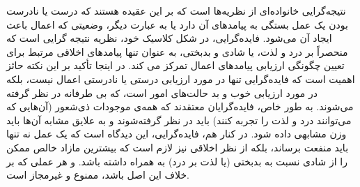 نتیجه‌گرایی خانواده‌ای از نظریه‌ها است که بر این عقیده هستند که درست یا نادرست بودن یک عمل بستگی به پیامدهای آن دارد یا به عبارت دیگر، وضعیتی که اعمال باعث ایجاد آن می‌شود.
فایده‌گرایی، در شکل کلاسیک خود، نظریه نتیجه گرایی است که منحصراً بر درد و لذت، یا شادی و بدبختی، به عنوان تنها پیامدهای اخلاقی مرتبط برای تعیین چگونگی ارزیابی پیامدهای اعمال تمرکز می کند.
در اینجا تأکید بر این نکته حائز اهمیت است که فایده‌گرایی تنها در مورد ارزیابی درستی یا نادرستی اعمال نیست، بلکه در مورد ارزیابی خوب و بد حالت‌های امور است، که بی طرفانه در نظر گرفته می‌شوند.
به طور خاص، فایده‌گرایان معتقدند که همه‌ی موجودات ذی‌شعور (آن‌هایی که می‌توانند درد و لذت را تجربه کنند) باید در نظر گرفته‌شوند و به علایق مشابه آن‌ها باید وزن مشابهی داده شود.
در کنار هم، فایده‌گرایی، این دیدگاه است که یک عمل نه تنها باید منفعت برساند، بلکه از نظر اخلاقی نیز لازم است که بیشترین مازاد خالص ممکن را از شادی نسبت به بدبختی (یا لذت بر درد) به همراه داشته باشد.
و هر عملی که بر خلاف این اصل باشد، ممنوع و غیرمجاز است.

\newpage

